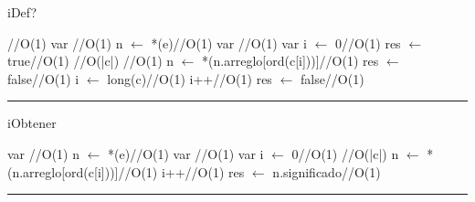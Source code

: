 \begin{algorithm}[H]
\caption{iDef?}
\begin{algorithmic}[1]
\hfill //O(1)
\state var \hfill //O(1)
\state n $\gets$ *(e)\hfill //O(1)
\state var \hfill //O(1)
\state var i $\gets$ 0\hfill //O(1)
\state res $\gets$ true\hfill //O(1)
\hfill //O(|c|)
\hfill //O(1)
\State n $\gets$ *(n.arreglo[ord(c[i]))]\hfill //O(1)
\Else
\State res $\gets$ false\hfill //O(1)
\state i $\gets$ long(c)\hfill //O(1)
\EndIf 
\state i++\hfill //O(1)
\endwhile
\Else
\state res $\gets$ false\hfill //O(1)
\EndIf
\EndFunction 
\end{algorithmic}
\hrule
{}
\end{algorithm}


\begin{algorithm}[H]
\caption{iObtener}
\begin{algorithmic}[1]
\state var \hfill //O(1)
\state n $\gets$ *(e)\hfill //O(1)
\state var \hfill //O(1)
\state var i $\gets$ 0\hfill //O(1)
\hfill //O(|c|)
\State n $\gets$ *(n.arreglo[ord(c[i]))]\hfill //O(1)
\state i++\hfill //O(1)
\endwhile
\state res $\gets$ n.significado\hfill //O(1)
\EndFunction 
\end{algorithmic}
\hrule
{}
\end{algorithm}

